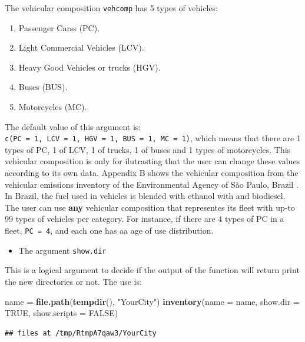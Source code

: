 \documentclass[12pt,graybox,envcountchap,sectrefs]{krantz}
\makeatletter
\newenvironment{Shaded}{\begin{snugshade}}{\end{snugshade}}
\newcommand{\KeywordTok}[1]{\textcolor[rgb]{0.13,0.29,0.53}{\textbf{#1}}}
\newcommand{\DataTypeTok}[1]{\textcolor[rgb]{0.13,0.29,0.53}{#1}}
\newcommand{\StringTok}[1]{\textcolor[rgb]{0.31,0.60,0.02}{#1}}
\newcommand{\OtherTok}[1]{\textcolor[rgb]{0.56,0.35,0.01}{#1}}
\newcommand{\NormalTok}[1]{#1}
\providecommand{\tightlist}{%
  \setlength{\itemsep}{0pt}\setlength{\parskip}{0pt}}
\newenvironment{kframe}{%
\medskip{}
\setlength{\fboxsep}{.8em}
 \def\at@end@of@kframe{}%
 \ifinner\ifhmode%
  \def\at@end@of@kframe{\end{minipage}}%
  \begin{minipage}{\columnwidth}%
 \fi\fi%
 \def\FrameCommand##1{\hskip\@totalleftmargin \hskip-\fboxsep
 \colorbox{shadecolor}{##1}\hskip-\fboxsep
     \hskip-\linewidth \hskip-\@totalleftmargin \hskip\columnwidth}%
 \MakeFramed {\advance\hsize-\width
   \@totalleftmargin\z@ \linewidth\hsize
   \@setminipage}}%
 {\par\unskip\endMakeFramed%
 \at@end@of@kframe}
\renewenvironment{Shaded}{\begin{kframe}}{\end{kframe}}
\theoremstyle{definition}
\theoremstyle{definition}
\theoremstyle{definition}
\theoremstyle{remark}
\makeatother
\begin{document}
The vehicular composition \texttt{vehcomp} has 5 types of vehicles:

\begin{enumerate}
\def\labelenumi{\arabic{enumi}.}
\tightlist
\item
  Passenger Carss (PC).
\item
  Light Commercial Vehicles (LCV).
\item
  Heavy Good Vehicles or trucks (HGV).
\item
  Buses (BUS).
\item
  Motorcycles (MC).
\end{enumerate}

The default value of this argument is:
\texttt{c(PC\ =\ 1,\ LCV\ =\ 1,\ HGV\ =\ 1,\ BUS\ =\ 1,\ MC\ =\ 1)},
which means that there are 1 types of PC, 1 of LCV, 1 of trucks, 1 of
buses and 1 types of motorcycles. This vehicular composition is only for
ilutrasting that the user can change these values according to its own
data. Appendix B shows the vehicular composition from the vehicular
emissions inventory of the Environmental Agency of São Paulo, Brazil
\citep{CETESB2015}. In Brazil, the fuel used in vehicles is blended with
ethanol with and biodiesel. The user can use \textbf{any} vehicular
composition that representes its fleet with up-to 99 types of vehicles
per category. For instance, if there are 4 types of PC in a fleet,
\texttt{PC\ =\ 4}, and each one has aa age of use distribution.

\begin{itemize}
\tightlist
\item
  The argument \texttt{show.dir}
\end{itemize}

This is a logical argument to decide if the output of the function will
return print the new directories or not. The use is:

\begin{Shaded}
\begin{Highlighting}[]
\NormalTok{name =}\StringTok{ }\KeywordTok{file.path}\NormalTok{(}\KeywordTok{tempdir}\NormalTok{(), }\StringTok{"YourCity"}\NormalTok{)}
\KeywordTok{inventory}\NormalTok{(}\DataTypeTok{name =}\NormalTok{ name, }\DataTypeTok{show.dir =} \OtherTok{TRUE}\NormalTok{, }\DataTypeTok{show.scripts =} \OtherTok{FALSE}\NormalTok{)}
\end{Highlighting}
\end{Shaded}

\begin{verbatim}
## files at /tmp/RtmpA7qaw3/YourCity
\end{verbatim}
\end{document}
